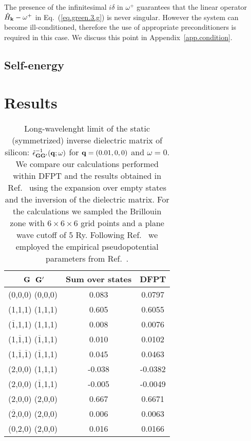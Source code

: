 \documentclass[twocolumn,prb,showpacs,superscriptaddress]{revtex4}
\def\w{\omega}
\def\H{\hat{H}}
\def\q{{\bf q}}
\def\k{{\bf k}}
\def\G{{\bf G}}
\def\Gp{{\bf G^\prime}}
\def\mo{$\overline{1}$}
\def\mt{$\overline{2}$}
\begin{document}
The presence of the infinitesimal $i\delta$ in $\w^+$ 
guarantees that the linear operator $\H_\k-\w^+$ in Eq.\ (\ref{eq.green.3.g}) is never singular.
However the system can become ill-conditioned, therefore the use of appropriate
preconditioners is required in this case. We discuss this point
in Appendix~\ref{app.condition}.
 
\subsection{Self-energy}\label{sec.sigma.g}

\section{Results}\label{sec.results}

\begin{table}[b!]
\caption{\label{tab.1} Long-wavelenght limit of the static (symmetrized)
inverse dielectric matrix of silicon: $\tilde\epsilon^{-1}_{\G\Gp}(\q;\w)$ for
$\q=(0.01,0,0)$ and $\w=0$. We compare our calculations performed within
DFPT and the results obtained in Ref.\ 
using the expansion over empty states and the inversion of the dielectric matrix.
For the calculations we sampled the Brillouin zone with $6\times6\times6$ grid
points and a plane wave cutoff of 5 Ry. Following Ref.\ 
we employed the empirical pseudopotential parameters from Ref.\ .
\vspace{0.5cm}}
\begin{tabular}{c c c}
\hline
\hline
$\,\,\G$\phantom{ciao} $\,\Gp$   & Sum over states\cite{balde_tosa}  &  DFPT  \\
\hline
    (0,0,0) (0,0,0)   & \phantom{-}0.083    &  \phantom{-}0.0797  \\
 (1,1,1)  (1,1,1)     &   \phantom{-}0.605  & \phantom{-}0.6055 \\
(\mo,1,1) (1,1,1)     &   \phantom{-}0.008  & \phantom{-}0.0076 \\
 (1,\mo,1) (\mo,1,1)  & \phantom{-}0.010    & \phantom{-}0.0102 \\
 (1,\mo,\mo) (\mo,1,1)& \phantom{-}0.045    & \phantom{-}0.0463 \\
 (2,0,0) (1,1,1)      &    -0.038           & -0.0382 \\
 (2,0,0) (\mo,1,1)    &    -0.005           & -0.0049 \\
 (2,0,0) (2,0,0)      &  \phantom{-}0.667   & \phantom{-}0.6671 \\
 (\mt,0,0) (2,0,0)    & \phantom{-}0.006    & \phantom{-}0.0063 \\
 (0,2,0) (2,0,0)      &  \phantom{-}0.016   & \phantom{-}0.0166 \\
\hline
\hline
\end{tabular}
\end{table}
\end{document}
